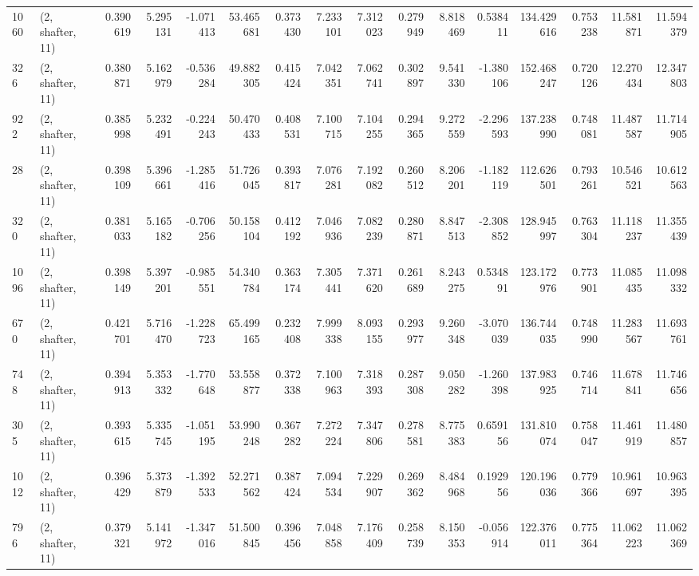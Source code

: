 \begin{tabular}{llrrrrrrrrrrrrrr}
1060 &  (2, shafter, 11) &   0.390619 &   5.295131 &  -1.071413 &     53.465681 &    0.373430 &    7.233101 &    7.312023 &  0.279949 &   8.818469 &   0.538411 &   134.429616 &   0.753238 &  11.581871 &  11.594379 \\
326  &  (2, shafter, 11) &   0.380871 &   5.162979 &  -0.536284 &     49.882305 &    0.415424 &    7.042351 &    7.062741 &  0.302897 &   9.541330 &  -1.380106 &   152.468247 &   0.720126 &  12.270434 &  12.347803 \\
922  &  (2, shafter, 11) &   0.385998 &   5.232491 &  -0.224243 &     50.470433 &    0.408531 &    7.100715 &    7.104255 &  0.294365 &   9.272559 &  -2.296593 &   137.238990 &   0.748081 &  11.487587 &  11.714905 \\
28   &  (2, shafter, 11) &   0.398109 &   5.396661 &  -1.285416 &     51.726045 &    0.393817 &    7.076281 &    7.192082 &  0.260512 &   8.206201 &  -1.182119 &   112.626501 &   0.793261 &  10.546521 &  10.612563 \\
320  &  (2, shafter, 11) &   0.381033 &   5.165182 &  -0.706256 &     50.158104 &    0.412192 &    7.046936 &    7.082239 &  0.280871 &   8.847513 &  -2.308852 &   128.945997 &   0.763304 &  11.118237 &  11.355439 \\
1096 &  (2, shafter, 11) &   0.398149 &   5.397201 &  -0.985551 &     54.340784 &    0.363174 &    7.305441 &    7.371620 &  0.261689 &   8.243275 &   0.534891 &   123.172976 &   0.773901 &  11.085435 &  11.098332 \\
670  &  (2, shafter, 11) &   0.421701 &   5.716470 &  -1.228723 &     65.499165 &    0.232408 &    7.999338 &    8.093155 &  0.293977 &   9.260348 &  -3.070039 &   136.744035 &   0.748990 &  11.283567 &  11.693761 \\
748  &  (2, shafter, 11) &   0.394913 &   5.353332 &  -1.770648 &     53.558877 &    0.372338 &    7.100963 &    7.318393 &  0.287308 &   9.050282 &  -1.260398 &   137.983925 &   0.746714 &  11.678841 &  11.746656 \\
305  &  (2, shafter, 11) &   0.393615 &   5.335745 &  -1.051195 &     53.990248 &    0.367282 &    7.272224 &    7.347806 &  0.278581 &   8.775383 &   0.659156 &   131.810074 &   0.758047 &  11.461919 &  11.480857 \\
1012 &  (2, shafter, 11) &   0.396429 &   5.373879 &  -1.392533 &     52.271562 &    0.387424 &    7.094534 &    7.229907 &  0.269362 &   8.484968 &   0.192956 &   120.196036 &   0.779366 &  10.961697 &  10.963395 \\
796  &  (2, shafter, 11) &   0.379321 &   5.141972 &  -1.347016 &     51.500845 &    0.396456 &    7.048858 &    7.176409 &  0.258739 &   8.150353 &  -0.056914 &   122.376011 &   0.775364 &  11.062223 &  11.062369 \\

\end{tabular}
